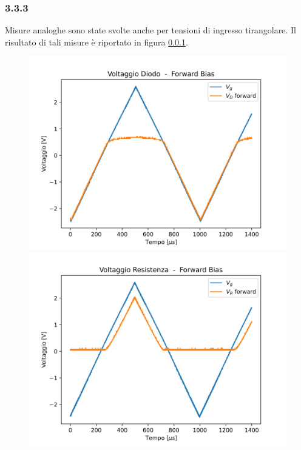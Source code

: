 \subsubsection{3.3.3}
Misure analoghe sono state svolte anche per tensioni di ingresso tirangolare. Il risultato di tali misure è riportato in figura \ref{}.
\begin{figure}
    \centering
    \begin{minipage}{0.475\textwidth}
        \includegraphics[width=1\textwidth]{Diodo 3.2.3/Triang_V_D_Forward.png}
    \end{minipage}
    \hfill
    \begin{minipage}{0.475\textwidth}
        \includegraphics[width=1\textwidth]{Diodo 3.2.3/Triang_V_R_Forward.png}

\end{minipage}
\end{figure}
